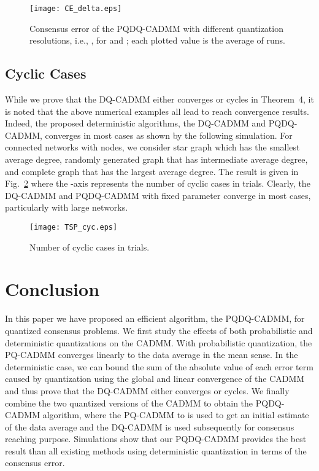 \documentclass[journal]{IEEEtran}
\begin{document}
\begin{figure}[h]
\vspace{-0.15in}
	\centering
	\texttt{[image: CE\_delta.eps]}\caption{Consensus error of the PQDQ-CADMM with different quantization resolutions, i.e., , for  and ; each plotted value is the average of  runs.}
	\label{fig:CEDelta}
\end{figure}

\subsection{Cyclic Cases}
While we prove that the DQ-CADMM either converges or cycles in Theorem~4, it is noted that the above numerical examples all lead to reach convergence results. Indeed, the proposed deterministic algorithms, the DQ-CADMM and PQDQ-CADMM, converges in most cases as shown by the following simulation. For connected networks with  nodes, we consider star graph which has the smallest average degree, randomly generated graph that has intermediate average degree, and complete graph that has the largest average degree. The result is given in Fig.~\ref{fig:cycnum} where the -axis represents the number of cyclic cases in  trials. Clearly, the DQ-CADMM and PQDQ-CADMM with fixed parameter  converge in most cases, particularly with large networks. 
\vspace{-0.15in}
\begin{figure}[h]
    \centering
    {\texttt{[image: TSP\_cyc.eps]}}
      \caption{Number of cyclic cases in  trials.}
      \label{fig:cycnum}
\end{figure}

\section{Conclusion}
\label{sec:conclusion}
In this paper we have proposed an efficient algorithm, the PQDQ-CADMM, for quantized consensus problems. We first study the effects of both probabilistic and deterministic quantizations on the CADMM. With probabilistic quantization, the PQ-CADMM converges linearly to the data average in the mean sense. In the deterministic case, we can bound the sum of the absolute value of each error term caused by quantization using the global and linear convergence of the CADMM and thus prove that the DQ-CADMM either converges or cycles. We finally combine the two quantized versions of the CADMM to obtain the PQDQ-CADMM algorithm, where the PQ-CADMM to is used to get an initial estimate of the data average and the DQ-CADMM is used subsequently for consensus reaching purpose. Simulations show that our PQDQ-CADMM provides the best result than all existing methods using deterministic quantization in terms of the consensus error.
\end{document}
